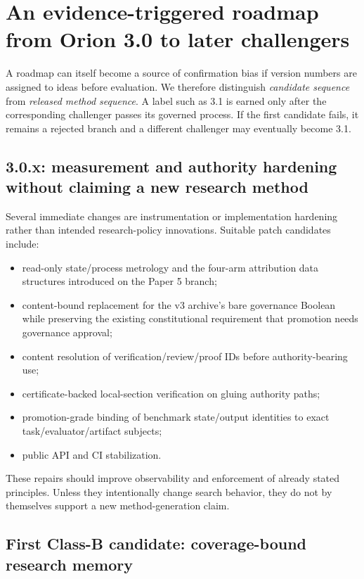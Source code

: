 \section{An evidence-triggered roadmap from Orion 3.0 to later challengers}
\label{sec:roadmap}

A roadmap can itself become a source of confirmation bias if version numbers are assigned to ideas before evaluation. We therefore distinguish \emph{candidate sequence} from \emph{released method sequence}. A label such as 3.1 is earned only after the corresponding challenger passes its governed process. If the first candidate fails, it remains a rejected branch and a different challenger may eventually become 3.1.

\subsection{3.0.x: measurement and authority hardening without claiming a new research method}

Several immediate changes are instrumentation or implementation hardening rather than intended research-policy innovations. Suitable patch candidates include:

\begin{itemize}[leftmargin=*]
\item read-only state/process metrology and the four-arm attribution data structures introduced on the Paper 5 branch;
\item content-bound replacement for the v3 archive's bare governance Boolean while preserving the existing constitutional requirement that promotion needs governance approval;
\item content resolution of verification/review/proof IDs before authority-bearing use;
\item certificate-backed local-section verification on gluing authority paths;
\item promotion-grade binding of benchmark state/output identities to exact task/evaluator/artifact subjects;
\item public API and CI stabilization.
\end{itemize}

These repairs should improve observability and enforcement of already stated principles. Unless they intentionally change search behavior, they do not by themselves support a new method-generation claim.

\subsection{First Class-B candidate: coverage-bound research memory}


